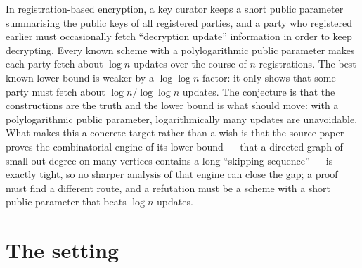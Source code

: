 \documentclass{conjura-conjecture}
\begin{document}

\vspace{0.4em}

\begin{informalconjecture}
In registration-based encryption, a key curator keeps a short public
parameter summarising the public keys of all registered parties, and a
party who registered earlier must occasionally fetch ``decryption
update'' information in order to keep decrypting. Every known scheme
with a polylogarithmic public parameter makes each party fetch about
$\log n$ updates over the course of $n$ registrations. The best known
lower bound is weaker by a $\log\log n$ factor: it only shows that some
party must fetch about $\log n / \log\log n$ updates. The conjecture is
that the constructions are the truth and the lower bound is what should
move: with a polylogarithmic public parameter, logarithmically many
updates are unavoidable. What makes this a concrete target rather than
a wish is that the source paper proves the combinatorial engine of its
lower bound --- that a directed graph of small out-degree on many
vertices contains a long ``skipping sequence'' --- is exactly tight, so
no sharper analysis of that engine can close the gap; a proof must find
a different route, and a refutation must be a scheme with a short
public parameter that beats $\log n$ updates.
\end{informalconjecture}

\section{The setting}\label{sec:setting}
\end{document}

